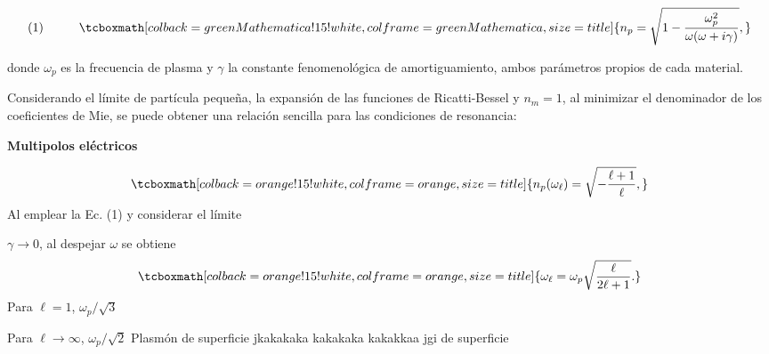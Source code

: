 \documentclass[a0paper,portrait]{baposter}
\begin{document}
\begin{poster}
{			\begin{minipage}[c]{0.55\textwidth}
				$$\text{(1)}\hspace{1cm} \tcboxmath[colback=greenMathematica!15!white ,colframe=greenMathematica,size=title]{n_p =\sqrt{1-\frac{\omega_p^2}{\omega(\omega+i\gamma)}},}$$
			\end{minipage}
				\begin{minipage}[c]{0.45\textwidth}
				donde $\omega_p$ es la frecuencia de plasma y $\gamma$ la constante fenomenológica de amortiguamiento, ambos parámetros propios de cada material.
			\end{minipage}			
			
			
			\vspace{0.2cm}
			Considerando el límite de partícula pequeña, la expansión de las funciones de Ricatti-Bessel \cite{Abramowitz} y $n_m=1$, al minimizar el denominador de los coeficientes de Mie, se puede obtener una relación sencilla para las condiciones de resonancia:\\
			
		
			\begin{minipage}[c]{.55\linewidth}
				\centerline{ {\color{orange}\textbf{Multipolos eléctricos} } }
				
				\vspace{-0.1cm}
				$$\tcboxmath[colback=orange!15!white ,colframe=orange,size=title]{n_p(\omega_\ell)=\sqrt{-\frac{\ell+1}{\ell}},}$$
				Al emplear la Ec. (1) y considerar el límite 
				
				$\gamma\rightarrow0$, al despejar $\omega$ se obtiene 
				$$\tcboxmath[colback=orange!15!white ,colframe=orange,size=title]{\omega_\ell=\omega_p\sqrt{\frac{\ell}{2\ell+1}}.}$$
				Para
				$\ell=1$, \hspace{0.5cm} $\omega_p/\sqrt{3}$
				
				Para $\ell \rightarrow \infty$, \hspace{0.25cm} $\omega_p/\sqrt{2} $ \hspace{0.3cm} {\scriptsize {\color{orange} Plasmón de superficie} {\color{white}jkakakaka kakakaka kakakkaa  jgi }{\color{orange}de superficie}}
			\end{minipage}
			}
\end{poster}
\end{document}
